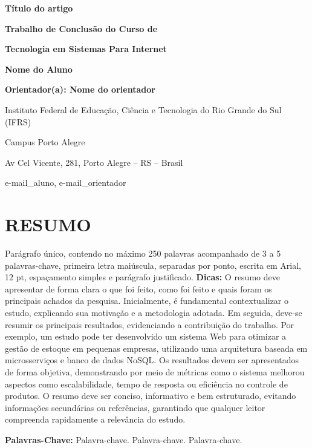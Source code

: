 \documentclass[
	article,			%
	12pt,				%
	oneside,			%
	a4paper,			%
	english,			%
	brazil,				%
	sumario=tradicional
]{abntex2}
\begin{document}
\thispagestyle{fancy}
\pagestyle{fancy}

{\rmfamily
\centerline{\fontsize{16}{19.2}\selectfont\textbf{Título do artigo}}
\vspace{0.8cm}
\centerline{\normalsize\textbf{Trabalho de Conclusão do Curso de}}
\centerline{\textbf{Tecnologia em Sistemas Para Internet}}
\vspace{1cm}
\centerline{\textbf{Nome do Aluno}}
\centerline{\textbf{Orientador(a): Nome do orientador}}
\vspace{0.8cm}
\centerline{Instituto Federal de Educação, Ciência e Tecnologia do Rio Grande do Sul (IFRS)}
\centerline{Campus Porto Alegre}
\centerline{Av Cel Vicente, 281, Porto Alegre – RS – Brasil}
\centerline{\ttfamily\small e-mail\_aluno, e-mail\_orientador}
}

\section*{RESUMO}
\begin{SingleSpace}
Parágrafo único, contendo no máximo 250 palavras acompanhado de 3 a 5
palavras-chave, primeira letra maiúscula, separadas por ponto, escrita em
Arial, 12 pt, espaçamento simples e parágrafo justificado. \textbf{Dicas:} O
resumo deve apresentar de forma clara o que foi feito, como foi feito e quais
foram os principais achados da pesquisa. Inicialmente, é fundamental
contextualizar o estudo, explicando sua motivação e a metodologia adotada. Em
seguida, deve-se resumir os principais resultados, evidenciando a contribuição
do trabalho. Por exemplo, um estudo pode ter desenvolvido um sistema Web para
otimizar a gestão de estoque em pequenas empresas, utilizando uma arquitetura
baseada em microsserviços e banco de dados NoSQL. Os resultados devem ser
apresentados de forma objetiva, demonstrando por meio de métricas como o
sistema melhorou aspectos como escalabilidade, tempo de resposta ou eficiência
no controle de produtos. O resumo deve ser conciso, informativo e bem
estruturado, evitando informações secundárias ou referências, garantindo que
qualquer leitor compreenda rapidamente a relevância do estudo.
\end{SingleSpace}

\noindent\textbf{Palavras-Chave:} Palavra-chave. Palavra-chave. Palavra-chave.
\end{document}
